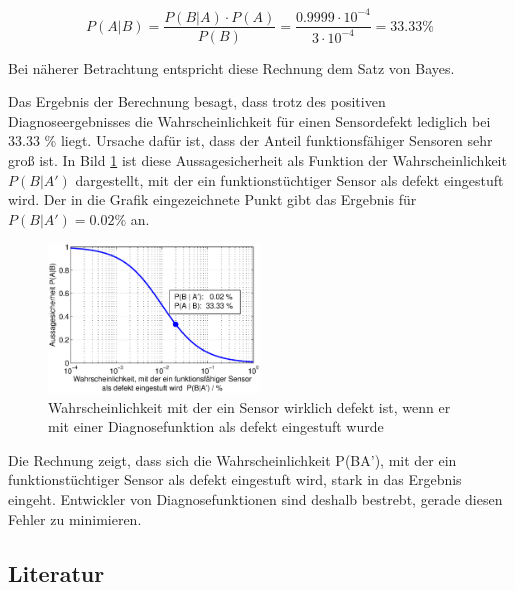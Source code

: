 \begin{equation}\label{eq:twoeightyseven}
P(A|B)=\dfrac{P(B|A)\cdot P(A)}{P(B)} =\dfrac{0.9999\cdot 10^{-4} }{3\cdot 10^{-4} } = 33.33 \% 
\end{equation}

\noindent Bei n\"{a}herer Betrachtung entspricht diese Rechnung dem Satz von Bayes.\newline

\noindent Das Ergebnis der Berechnung besagt, dass trotz des positiven Diagnoseergebnisses die Wahrscheinlichkeit f\"{u}r einen Sensordefekt lediglich bei 33.33 \% liegt. Ursache daf\"{u}r ist, dass der Anteil funktionsf\"{a}higer Sensoren sehr gro{\ss} ist. In Bild \ref{fig:SensorDiagnose} ist diese Aussagesicherheit als Funktion der Wahrscheinlichkeit $P(B|A')$ dargestellt, mit der ein funktionst\"{u}chtiger Sensor als defekt eingestuft wird. Der in die Grafik eingezeichnete Punkt gibt das Ergebnis f\"{u}r $P(B|A') = 0.02 \%$ an.

\noindent 
\begin{figure}[H]
  \centerline{\includegraphics[width=0.5\textwidth]{Kapitel2/Bilder/image16}}
  \caption{Wahrscheinlichkeit mit der ein Sensor wirklich defekt ist, wenn er mit einer Diagnosefunktion als defekt eingestuft wurde}
  \label{fig:SensorDiagnose}
\end{figure}

\noindent Die Rechnung zeigt, dass sich die Wahrscheinlichkeit P(B{\textbar}A'), mit der ein funktionst\"{u}chtiger Sensor als defekt eingestuft wird, stark in das Ergebnis eingeht. Entwickler von Diagnosefunktionen sind deshalb bestrebt, gerade diesen Fehler zu minimieren.

\clearpage

\subsection{Literatur}



